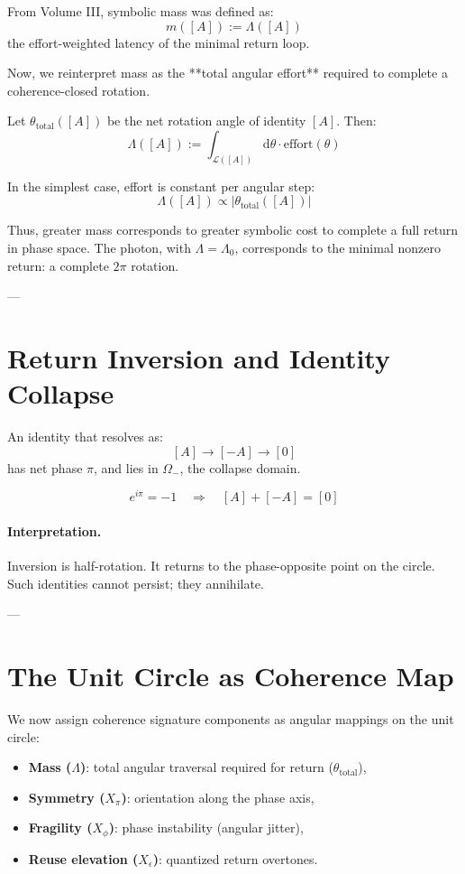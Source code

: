 From Volume III, symbolic mass was defined as:
\[
m([A]) := \Lambda([A])
\]
the effort-weighted latency of the minimal return loop.

Now, we reinterpret mass as the **total angular effort** required to complete a coherence-closed rotation.

\begin{definition}
Let $\theta_{\text{total}}([A])$ be the net rotation angle of identity $[A]$. Then:
\[
\Lambda([A]) := \int_{\mathcal{L}([A])} \mathrm{d}\theta \cdot \text{effort}(\theta)
\]
\end{definition}

In the simplest case, effort is constant per angular step:
\[
\Lambda([A]) \propto |\theta_{\text{total}}([A])|
\]

Thus, greater mass corresponds to greater symbolic cost to complete a full return in phase space. The photon, with $\Lambda = \Lambda_0$, corresponds to the minimal nonzero return: a complete $2\pi$ rotation.

---

\section{Return Inversion and Identity Collapse}

\begin{definition}
An identity that resolves as:
\[
[A] \to [-A] \to [0]
\]
has net phase $\pi$, and lies in $\Omega_-$, the collapse domain.
\end{definition}

\[
e^{i\pi} = -1 \quad \Rightarrow \quad [A] + [-A] = [0]
\]

\paragraph{Interpretation.}  
Inversion is half-rotation. It returns to the phase-opposite point on the circle. Such identities cannot persist; they annihilate.

---

\section{The Unit Circle as Coherence Map}

We now assign coherence signature components as angular mappings on the unit circle:

\begin{itemize}
    \item \textbf{Mass ($\Lambda$)}: total angular traversal required for return ($\theta_{\text{total}}$),
    \item \textbf{Symmetry ($X_\pi$)}: orientation along the phase axis,
    \item \textbf{Fragility ($X_\phi$)}: phase instability (angular jitter),
    \item \textbf{Reuse elevation ($X_\epsilon$)}: quantized return overtones.
\end{itemize}

